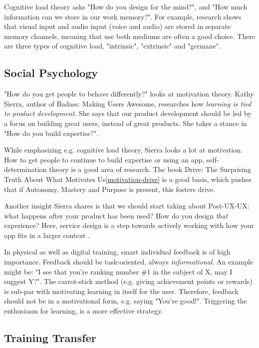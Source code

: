 Cognitive load theory asks "How do you design for the mind?", and "How much information can we store in our work memory?". For example, research shows that visual input and audio input (voice and audio) are stored in separate memory channels, meaning that use both mediums are often a good choice. There are three types of cognitive load, "intrinsic", "extrinsic" and "germane".



\subsection{Social Psychology} 

"How do you get people to behave differently?" looks at motivation theory. Kathy Sierra, author of Badass: Making Users Awesome\citep{interactiondesign-badass}, researches how \textit{learning is tied to product development}. She says that our product development should be led by a focus on building great users, instead of great products. She takes a stance in "How do you build expertise?".

While emphasizing e.g. cognitive load theory, Sierra looks a lot at motivation. How to get people to continue to build expertise or using an app, self-determination theory is a good area of research. The book Drive: The Surprising Truth About What Motivates Us\ref{motivation-drive} is a good basis, which pushes that if Autonomy, Mastery and Purpose is present, this fosters drive.

Another insight Sierra shares is that we should start taking about Post-UX-UX: what happens after your product has been used? How do you design \textit{that} experience? Here, service design is a step towards actively working with how your app fits in a larger context \citep{servicedesign-ideo}.

In physical as well as digital training, smart individual feedback is of high importance. Feedback should be task-oriented, always \textit{informational}. An example might be: "I see that you're ranking number \#1 in the subject of X, may I suggest Y?". The carrot-stick method (e.g. giving achievement points or rewards) is sub-par with motivating learning in itself for the user. Therefore, feedback should not be in a motivational form, e.g. saying "You're good!". Triggering the enthusiasm for learning, is a more effective strategy.



\subsection{Training Transfer}

